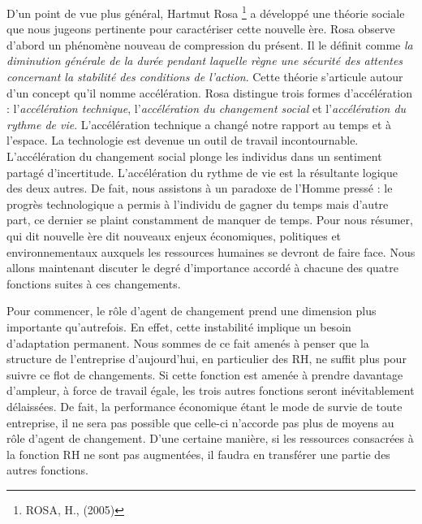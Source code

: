 \documentclass[a4paper, 12pt]{article}
\begin{document}
D'un point de vue plus général, Hartmut Rosa \footnote{ROSA, H., (2005)} a développé une théorie sociale que nous jugeons pertinente pour caractériser cette nouvelle ère. Rosa observe d'abord un phénomène nouveau de compression du présent. Il le définit comme \textit{la diminution générale de la durée pendant laquelle règne une sécurité des attentes concernant la stabilité des conditions de l'action}. Cette théorie s'articule autour d'un concept qu'il nomme accélération. Rosa distingue trois formes d'accélération : l'\textit{accélération technique}, l'\textit{accélération du changement social} et l'\textit{accélération du rythme de vie}. L'accélération technique a changé notre rapport au temps et à l'espace. La technologie est devenue un outil de travail incontournable. L'accélération du changement social plonge les individus dans  un sentiment partagé d'incertitude. L'accélération du rythme de vie est la résultante logique des deux autres. De fait, nous assistons à un paradoxe de l'Homme pressé : le progrès technologique a permis à l'individu de gagner du temps mais d'autre part, ce dernier se plaint constamment de manquer de temps. Pour nous résumer, qui dit nouvelle ère dit nouveaux enjeux économiques, politiques et environnementaux auxquels les ressources humaines se devront de faire face.
Nous allons maintenant discuter le degré d'importance accordé à chacune des quatre fonctions suites à ces changements.

Pour commencer, le rôle d'agent de changement prend une dimension plus importante qu'autrefois. En effet, cette instabilité implique un besoin d'adaptation permanent. Nous sommes de ce fait amenés à penser que la structure de l'entreprise d'aujourd'hui, en particulier des RH, ne suffit plus pour suivre ce flot de changements. Si cette fonction est amenée à prendre davantage d'ampleur, à force de travail égale, les trois autres fonctions seront inévitablement délaissées. De fait, la performance économique étant le mode de survie de toute entreprise, il ne sera pas possible que celle-ci n'accorde pas plus de moyens au rôle d'agent de changement. D'une certaine manière, si les ressources consacrées à la fonction RH ne sont pas augmentées, il faudra en transférer une partie des autres fonctions.
\end{document}
